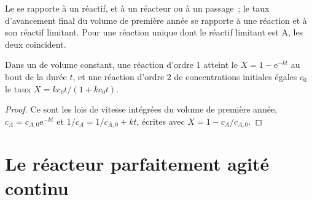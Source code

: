 Le  se rapporte à un réactif, et à un réacteur ou à un passage~; le
taux d'avancement final du volume de première année se rapporte à une réaction et à son
réactif limitant. Pour une réaction unique dont le réactif limitant est A, les
deux coïncident.

\begin{proposition}\label{prop:b2:continuous-reactors:batch}
Dans un  de volume constant, une réaction d'ordre 1 atteint le
 $X = 1 - \mathrm e^{-kt}$ au bout de la durée $t$, et une réaction d'ordre 2
de concentrations initiales égales $c_0$ le taux $X =
kc_0t/(1 + kc_0t)$.
\end{proposition}

\begin{proof}
Ce sont les lois de vitesse intégrées du volume de première année, $c_A = c_{A,0}
\mathrm e^{-kt}$ et $1/c_A = 1/c_{A,0} + kt$, écrites avec $X = 1 -
c_A/c_{A,0}$.
\end{proof}

\section{Le réacteur parfaitement agité continu}

